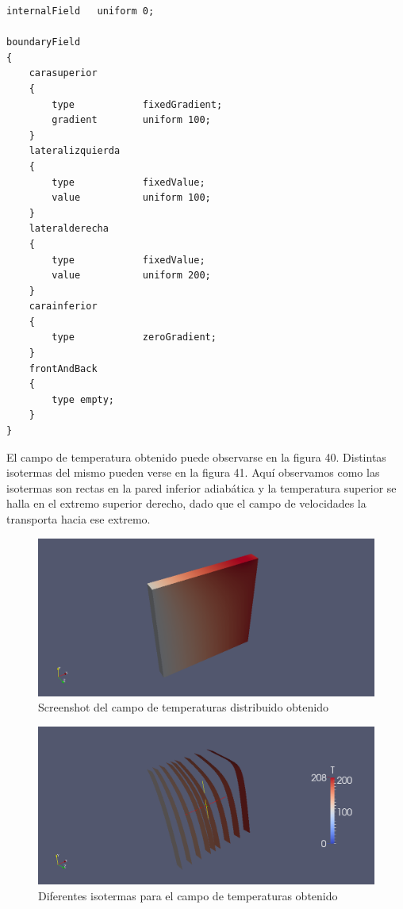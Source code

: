 \documentclass[11pt]{article}
\begin{document}
\bigskip
\lstset{language=Matlab, breaklines=true, basicstyle=\footnotesize}
\begin{lstlisting}[frame=single]
internalField   uniform 0;

boundaryField
{
	carasuperior
    {
        type            fixedGradient;
		gradient		uniform 100;
    }
	lateralizquierda
    {
        type            fixedValue;
		value			uniform 100;
    }
    lateralderecha
    {
        type            fixedValue;
		value			uniform 200;
    }
	carainferior
    {
        type            zeroGradient;
    }
    frontAndBack
    {
        type empty;
    }
}
\end{lstlisting}
\bigskip

El campo de temperatura obtenido puede observarse en la figura 40. Distintas isotermas del mismo pueden verse en la figura 41. Aqu\'i observamos como las isotermas son rectas en la pared inferior adiab\'atica y la temperatura superior se halla en el extremo superior derecho, dado que el campo de velocidades la transporta hacia ese extremo.

\begin{figure}[tbh]
	\centering
		\includegraphics[width=1.0\textwidth]{imagen40.png}
	\caption{Screenshot del campo de temperaturas distribuido obtenido}
	\label{fig:Fig1}
\end{figure}

\begin{figure}[tbh]
	\centering
		\includegraphics[width=1.0\textwidth]{imagen41.png}
	\caption{Diferentes isotermas para el campo de temperaturas obtenido}
	\label{fig:Fig1}
\end{figure}
\end{document}
